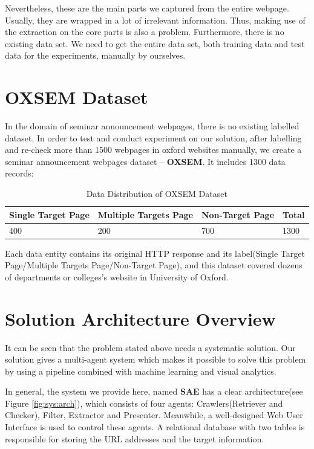 Nevertheless, these are the main parts we captured from the entire webpage. Usually, they are wrapped in a lot of irrelevant information. Thus, making use of the extraction on the core parts is also a problem. Furthermore, there is no existing data set. We need to get the entire data set, both training data and test data for the experiments, manually by ourselves.

\section{OXSEM Dataset}
In the domain of seminar announcement webpages, there is no existing labelled dataset. In order to test and conduct experiment on our solution, after labelling and re-check more than 1500 webpages in oxford websites manually, we create a seminar announcement webpages dataset -- \textbf{OXSEM}. It includes 1300 data records:

\begin{table}[htb]
\small
\centering
\caption{Data Distribution of OXSEM Dataset}
\label{tab:dataset}
\begin{tabular}{@{}lll|l@{}}
\toprule
Single Target Page & Multiple Targets Page & Non-Target Page & Total \\ \midrule
400                & 200                  & 700             & 1300    \\ \bottomrule
\end{tabular}
\end{table}
Each data entity contains its original HTTP response and its label(Single Target Page/Multiple Targets Page/Non-Target Page), and this dataset covered dozens of departments or colleges's website in University of Oxford.

\section{Solution Architecture Overview}
It can be seen that the problem stated above needs a systematic solution. Our solution gives a multi-agent system which makes it possible to solve this problem by using a pipeline combined with machine learning and visual analytics.

In general, the system we provide here, named \textbf{SAE} has a clear architecture(see Figure \ref{fig:sys:arch}), which consists of four agents: Crawlers(Retriever and Checker), Filter, Extractor and Presenter. Meanwhile, a well-designed Web User Interface is used to control these agents. A relational database with two tables is responsible for storing the URL addresses and the target information.

